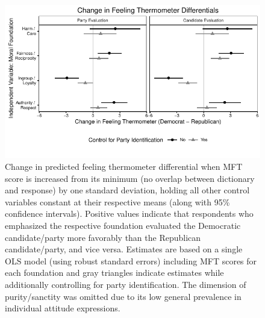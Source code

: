 \documentclass[12pt]{article}
\begin{document}
\begin{figure}[ht]\centering
\includegraphics{../calc/fig/ols_feel.pdf}
\caption{Change in predicted feeling thermometer differential when MFT score is increased from its minimum (no overlap between dictionary and response) by one standard deviation, holding all other control variables constant at their respective means (along with 95\% confidence intervals). Positive values indicate that respondents who emphasized the respective foundation evaluated the Democratic candidate/party more favorably than the Republican candidate/party, and vice versa. Estimates are based on a single OLS model (using robust standard errors) including MFT scores for each foundation and gray triangles indicate estimates while additionally controlling for party identification. The dimension of purity/sanctity was omitted due to its low general prevalence in individual attitude expressions. %
}\label{fig:ols_feel}
\end{figure}
\end{document}
